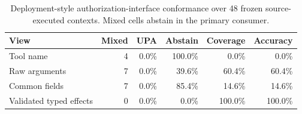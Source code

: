 \begin{table}[t]
\centering
\small
\caption{Deployment-style authorization-interface conformance over 48 frozen source-executed contexts. Mixed cells abstain in the primary consumer.}
\label{tab:deployment-authz-interface}
\begin{tabular}{lrrrrr}
\toprule
View & Mixed & UPA & Abstain & Coverage & Accuracy \\
\midrule
Tool name & 4 & 0.0\% & 100.0\% & 0.0\% & 0.0\% \\
Raw arguments & 7 & 0.0\% & 39.6\% & 60.4\% & 60.4\% \\
Common fields & 7 & 0.0\% & 85.4\% & 14.6\% & 14.6\% \\
Validated typed effects & 0 & 0.0\% & 0.0\% & 100.0\% & 100.0\% \\
\bottomrule
\end{tabular}
\end{table}
